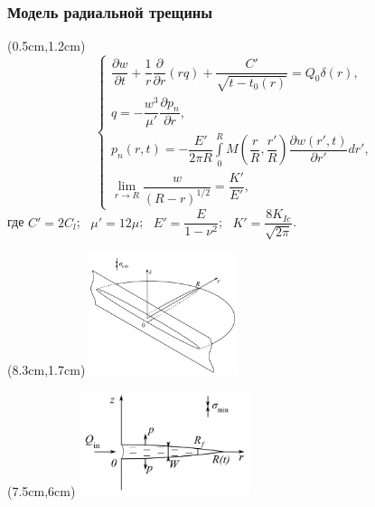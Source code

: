 \documentclass{beamer}
\begin{document}
\begin{frame}
\frametitle{Модель радиальной трещины}

\begin{textblock*}{7cm}(0.5cm,1.2cm)
$$
\begin{cases}
\dfrac{\partial w}{\partial t}+\dfrac{1}{r}\dfrac{\partial}{\partial r}\left(rq\right)+\dfrac{C'}{\sqrt{t-t_0(r)}}=Q_0\delta(r),\\[15pt]
q=-\dfrac{w^3}{\mu'}\dfrac{\partial p_n}{\partial r},\\[5pt]
p_n(r,t)=-\dfrac{E'}{2\pi R}\displaystyle\int\limits_{0}^{R}M\left(\dfrac{r}{R},\dfrac{r'}{R}\right)\dfrac{\partial w(r',t)}{\partial r'}dr',\\[20pt]
\displaystyle\lim_{r\to R}\dfrac{w}{(R-r)^{1/2}}=\dfrac{K'}{E'},
\end{cases}
$$
где $C'=2C_l$; $\,\,\,\mu'=12\mu$; $\,\,\,E'=\dfrac{E}{1-\nu^2}$; $\,\,\,K'=\dfrac{8K_{Ic}}{\sqrt{2\pi}}$.
\end{textblock*}

\begin{textblock*}{7cm}(8.3cm,1.7cm)
\includegraphics[width=4.3cm]{radial_model_3D.jpg}
\end{textblock*}

\begin{textblock*}{7cm}(7.5cm,6cm)
\includegraphics[width=5cm]{radial_model_A-A_plane.jpg}
\end{textblock*}

\end{frame}
\end{document}
